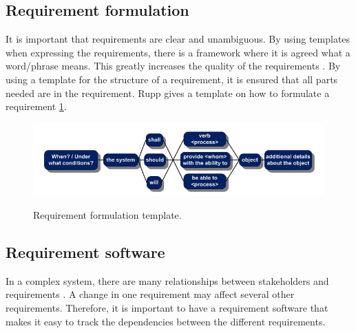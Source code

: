 \subsection{Requirement formulation}
It is important that requirements are clear and unambiguous. By using templates
when expressing the requirements, there is a framework where it is agreed what a
word/phrase means. This greatly increases the quality of the requirements
\cite{rupp2014}. By using a template for the structure of a requirement, it is
ensured that all parts needed are in the requirement. Rupp \cite{rupp2014}
gives a template on how to formulate a requirement \ref{fig:req_template}.
\begin{figure}[H]
    \centering
    \includegraphics[width=\textwidth]{./img/introduction_req_template}
    \label{fig:req_template}
    \caption{Requirement formulation template.}
\end{figure}

\subsection{Requirement software}
In a complex system, there are many relationships between stakeholders and
requirements \cite{ibm_req}. A change in one requirement may affect several other
requirements.  Therefore, it is important to have a requirement software that
makes it easy to track the dependencies between the different requirements.


